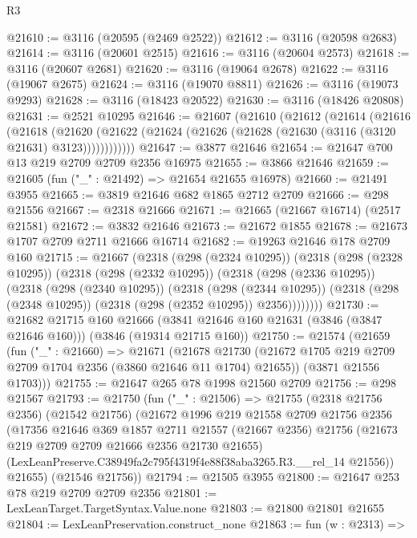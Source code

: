 \begin{lexlean}{R3}
\begin{coremodule}
@21610 := @3116 (@20595 (@2469 @2522))
@21612 := @3116 (@20598 @2683)
@21614 := @3116 (@20601 @2515)
@21616 := @3116 (@20604 @2573)
@21618 := @3116 (@20607 @2681)
@21620 := @3116 (@19064 @2678)
@21622 := @3116 (@19067 @2675)
@21624 := @3116 (@19070 @8811)
@21626 := @3116 (@19073 @9293)
@21628 := @3116 (@18423 @20522)
@21630 := @3116 (@18426 @20808)
@21631 := @2521 @10295
@21646 := @21607
    (@21610
      (@21612
        (@21614
          (@21616
            (@21618
              (@21620
                (@21622 (@21624 (@21626 (@21628 (@21630 (@3116 (@3120 @21631) @3123))))))))))))
@21647 := @3877 @21646
@21654 := @21647 @700 @13 @219 @2709 @2709 @2356 @16975
@21655 := @3866 @21646
@21659 := @21605 (fun ("_" : @21492) => @21654 @21655 @16978)
@21660 := @21491 @3955
@21665 := @3819 @21646 @682 @1865 @2712 @2709
@21666 := @298 @21556
@21667 := @2318 @21666
@21671 := @21665 (@21667 @16714) (@2517 @21581)
@21672 := @3832 @21646
@21673 := @21672 @1855
@21678 := @21673 @1707 @2709 @2711 @21666 @16714
@21682 := @19263 @21646 @178 @2709 @160
@21715 := @21667
    (@2318
      (@298 (@2324 @10295))
      (@2318
        (@298 (@2328 @10295))
        (@2318
          (@298 (@2332 @10295))
          (@2318
            (@298 (@2336 @10295))
            (@2318
              (@298 (@2340 @10295))
              (@2318
                (@298 (@2344 @10295))
                (@2318 (@298 (@2348 @10295)) (@2318 (@298 (@2352 @10295)) @2356))))))))
@21730 := @21682
    @21715
    @160
    @21666
    (@3841 @21646 @160 @21631 (@3846 (@3847 @21646 @160)))
    (@3846 (@19314 @21715 @160))
@21750 := @21574
    (@21659
      (fun ("_" : @21660) =>
      @21671
        (@21678 @21730 (@21672 @1705 @219 @2709 @2709 @1704 @2356 (@3860 @21646 @11 @1704) @21655))
        (@3871 @21556 @1703)))
@21755 := @21647 @265 @78 @1998 @21560 @2709
@21756 := @298 @21567
@21793 := @21750
    (fun ("_" : @21506) =>
    @21755
      (@2318 @21756 @2356)
      (@21542 @21756)
      (@21672
        @1996
        @219
        @21558
        @2709
        @21756
        @2356
        (@17356
          @21646
          @369
          @1857
          @2711
          @21557
          (@21667 @2356)
          @21756
          (@21673 @219 @2709 @2709 @21666 @2356 @21730 @21655)
          (LexLeanPreserve.C38949fa2c795f4319f4e88f38aba3265.R3.__rel_14 @21556))
        @21655)
      (@21546 @21756))
@21794 := @21505 @3955
@21800 := @21647 @253 @78 @219 @2709 @2709 @2356
@21801 := LexLeanTarget.TargetSyntax.Value.none
@21803 := @21800 @21801 @21655
@21804 := LexLeanPreservation.construct_none
@21863 := fun (w : @2313) =>

\end{coremodule}
\end{lexlean}
